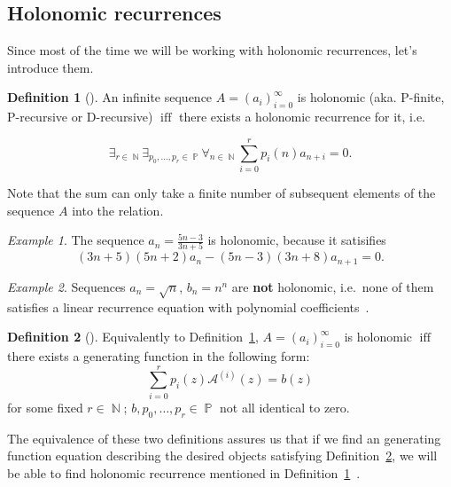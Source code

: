\documentclass[final]{article}
\theoremstyle{definition}
\newtheorem{definition}{Definition}[subsection]
\theoremstyle{remark}
\newtheorem{example}{Example}[subsection]
\newcommand{\gf}[1]{\ensuremath{\mathcal{#1}}}
\DeclareMathOperator{\textiff}{\text{iff}}
\DeclareMathOperator{\N}{\mathbb{N}}
\DeclareMathOperator{\poly}{\mathbb{P}}
\begin{document}
\subsection{Holonomic recurrences}%
\label{sub:holonomic_recurrences}

Since most of the time we will be working with holonomic recurrences, let's introduce them.

\begin{definition}[\cite{holotoolkit}]
    \label{def:holo_1}
    An infinite sequence \(A = (a_i)_{i=0}^{\infty}\) is holonomic (aka. P-finite, P-recursive or D-recursive) \(\textiff\) there exists a holonomic recurrence for it, i.e.

\[\exists_{r \in \N} \exists_{p_0, \ldots, p_r \in \poly} \forall_{n \in \N} \sum_{i=0}^r p_i(n)a_{n+i} = 0 .\]
\end{definition}

Note that the sum can only take a finite number of subsequent elements of the sequence \(A\) into the relation.

\begin{example}
    The sequence \(a_n = \frac{5n - 3}{3n + 5}\) is holonomic, because it satisifies
    \[(3n + 5)(5n + 2) a_n - (5n - 3)(3n + 8) a_{n+1} = 0 .\]
\end{example}

\begin{example}
    Sequences \(a_n = \sqrt{n}\), \(b_n = n^n\) are \textbf{not} holonomic, i.e.\ none of them satisfies a linear recurrence equation with polynomial coefficients~\cite{nonholo}.
\end{example}

\begin{definition}[\cite{complexity}]
    \label{def:holo_2}
    Equivalently to Definition~\ref{def:holo_1}, \(A = (a_i)_{i=0}^{\infty}\) is holonomic \(\textiff\) there exists a generating function in the following form:
    \[\sum_{i=0}^{r} p_i(z) \gf{A}^{(i)}(z) = b(z)\]
    for some fixed \(r \in \N\); \(b, p_0, \ldots, p_r \in \poly\) not all identical to zero.
\end{definition}

The equivalence of these two definitions assures us that if we find an generating function equation describing the desired objects satisfying Definition~\ref{def:holo_2}, we will be able to find holonomic recurrence mentioned in Definition~\ref{def:holo_1}~\cite{complexity}.
\end{document}
